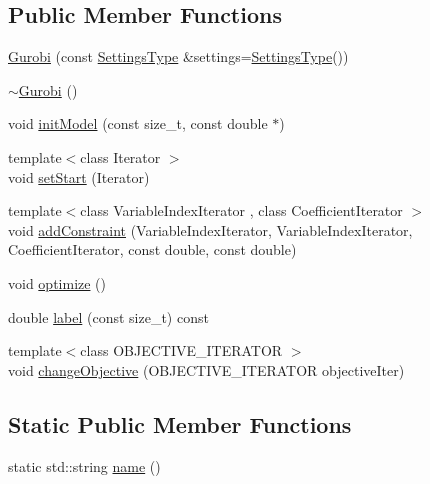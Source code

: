 \subsection*{Public Member Functions}
\begin{DoxyCompactItemize}
\item 
\hyperlink{classnifty_1_1ilp__backend_1_1Gurobi_ad1fe3b5d2314c16f2a334d13e7abda8f}{Gurobi} (const \hyperlink{classnifty_1_1ilp__backend_1_1Gurobi_a452f0f9dbcdf6bf9741607e9561fa3c5}{Settings\+Type} \&settings=\hyperlink{classnifty_1_1ilp__backend_1_1Gurobi_a452f0f9dbcdf6bf9741607e9561fa3c5}{Settings\+Type}())
\item 
\hyperlink{classnifty_1_1ilp__backend_1_1Gurobi_ab8e373ce16adba177e9341a2d0e55157}{$\sim$\+Gurobi} ()
\item 
void \hyperlink{classnifty_1_1ilp__backend_1_1Gurobi_ac4ee3e8981df207094a6580f07f2685d}{init\+Model} (const size\+\_\+t, const double $\ast$)
\item 
{\footnotesize template$<$class Iterator $>$ }\\void \hyperlink{classnifty_1_1ilp__backend_1_1Gurobi_a0875ce6a8a39917a496ec650c68da6a0}{set\+Start} (Iterator)
\item 
{\footnotesize template$<$class Variable\+Index\+Iterator , class Coefficient\+Iterator $>$ }\\void \hyperlink{classnifty_1_1ilp__backend_1_1Gurobi_ad4e3fa2d4f5fe726a46d40857c36a918}{add\+Constraint} (Variable\+Index\+Iterator, Variable\+Index\+Iterator, Coefficient\+Iterator, const double, const double)
\item 
void \hyperlink{classnifty_1_1ilp__backend_1_1Gurobi_a2521e51c0cdfb1e029d332ab7f203021}{optimize} ()
\item 
double \hyperlink{classnifty_1_1ilp__backend_1_1Gurobi_a510a33ec8e49b005e5a2a0802d8e0383}{label} (const size\+\_\+t) const
\item 
{\footnotesize template$<$class O\+B\+J\+E\+C\+T\+I\+V\+E\+\_\+\+I\+T\+E\+R\+A\+T\+OR $>$ }\\void \hyperlink{classnifty_1_1ilp__backend_1_1Gurobi_a138de39ce46740b4728b9d2e7f8bd27b}{change\+Objective} (O\+B\+J\+E\+C\+T\+I\+V\+E\+\_\+\+I\+T\+E\+R\+A\+T\+OR objective\+Iter)
\end{DoxyCompactItemize}
\subsection*{Static Public Member Functions}
\begin{DoxyCompactItemize}
\item 
static std\+::string \hyperlink{classnifty_1_1ilp__backend_1_1Gurobi_a3c80f9769e9f33482397305e234b0aa7}{name} ()
\end{DoxyCompactItemize}


